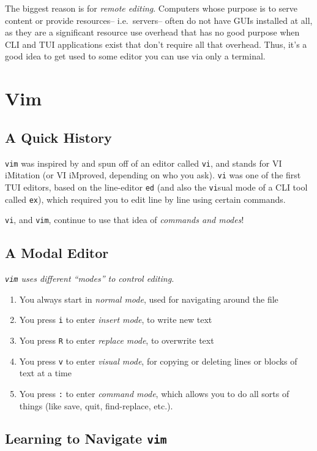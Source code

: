 The biggest reason is for {\em remote editing}. Computers whose purpose is to
serve content or provide resources-- i.e.\ servers-- often do not have GUIs
installed at all, as they are a significant resource use overhead that has no
good purpose when CLI and TUI applications exist that don't require all that
overhead. Thus, it's a good idea to get used to some editor you can use via
only a terminal.

\section{Vim}

\subsection{A Quick History}

{\tt vim} was inspired by and spun off of an editor called {\tt vi}, and stands
for VI iMitation (or VI iMproved, depending on who you ask). {\tt vi} was one
of the first TUI editors, based on the line-editor {\tt ed} (and also the {\tt vi}sual
mode of a CLI tool called {\tt ex}), which required you to edit line by line using
certain commands.

{\tt vi}, and {\tt vim}, continue to use that idea of {\em commands and modes}!

\subsection{A Modal Editor}

{\em {\tt vim} uses different ``modes'' to control editing.}

\begin{enumerate}
  \item You always start in {\em normal mode}, used for navigating around the file
  \item You press {\tt i} to enter {\em insert mode}, to write new text
  \item You press {\tt R} to enter {\em replace mode}, to overwrite text
  \item You press {\tt v} to enter {\em visual mode}, for copying or deleting lines or blocks of text at a time
  \item You press {\tt :} to enter {\em command mode}, which allows you to do all sorts of things (like save, quit, find-replace, etc.).
\end{enumerate}

\subsection{Learning to Navigate {\tt vim}}

